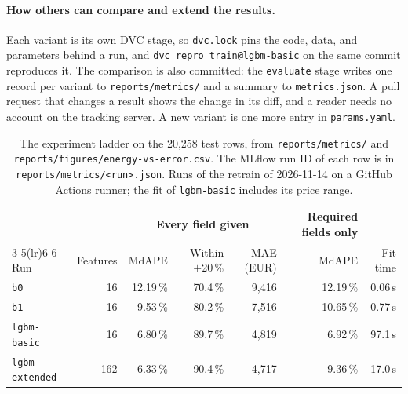 \paragraph{How others can compare and extend the results.}
Each variant is its own DVC stage, so \texttt{dvc.lock} pins the code, data, and parameters behind a run, and \texttt{dvc repro train@lgbm-basic} on the same commit reproduces it.
The comparison is also committed: the \texttt{evaluate} stage writes one record per variant to \texttt{reports/metrics/} and a summary to \texttt{metrics.json}.
A pull request that changes a result shows the change in its diff, and a reader needs no account on the tracking server.
A new variant is one more entry in \texttt{params.yaml}.

\begin{table}[ht]
  \centering\small
  \begin{tabular}{@{}lrrrrrr@{}}
    \toprule
    & & \multicolumn{3}{c}{Every field given} & Required fields only & \\
    \cmidrule(lr){3-5}\cmidrule(lr){6-6}
    Run & Features & MdAPE & Within $\pm$20\,\% & MAE (EUR) & MdAPE & Fit time \\
    \midrule
    \texttt{b0} & 16 & 12.19\,\% & 70.4\,\% & 9,416 & 12.19\,\% & 0.06\,s \\
    \texttt{b1} & 16 & 9.53\,\% & 80.2\,\% & 7,516 & 10.65\,\% & 0.77\,s \\
    \texttt{lgbm-basic} & 16 & 6.80\,\% & 89.7\,\% & 4,819 & 6.92\,\% & 97.1\,s \\
    \texttt{lgbm-extended} & 162 & 6.33\,\% & 90.4\,\% & 4,717 & 9.36\,\% & 17.0\,s \\
    \bottomrule
  \end{tabular}
  \caption{The experiment ladder on the 20,258 test rows, from \texttt{reports/metrics/} and \texttt{reports/figures/energy-vs-error.csv}. The MLflow run ID of each row is in \texttt{reports/metrics/<run>.json}. Runs of the retrain of 2026-11-14 on a GitHub Actions runner; the fit of \texttt{lgbm-basic} includes its price range.}
  \label{tab:runs}
\end{table}

